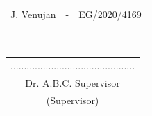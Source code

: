 \begin{center}
\begin{tabular}[h]{lll}
 J. Venujan	& - & 	EG/2020/4169
\end{tabular}\\
\vspace{1cm}

\vspace{1cm}

\begin{tabular}[h]{c}
.............................................. \\
Dr. A.B.C. Supervisor\\
(Supervisor)
\end{tabular}\\

\end{center}

